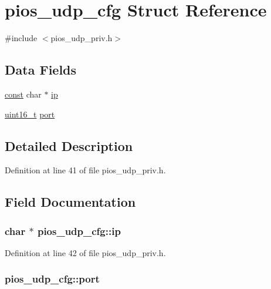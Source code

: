 \hypertarget{structpios__udp__cfg}{\section{pios\-\_\-udp\-\_\-cfg Struct Reference}
\label{structpios__udp__cfg}
}


{\ttfamily \#include $<$pios\-\_\-udp\-\_\-priv.\-h$>$}

\subsection*{Data Fields}
\begin{DoxyCompactItemize}
\item 
\hyperlink{group___n_a_m_e_ga7ae6d0e43244213b34de2c2b9aa30da6}{const} char $\ast$ \hyperlink{structpios__udp__cfg_ae175924ccc5810dfd561b30fb4e47287}{ip}
\item 
\hyperlink{stdint_8h_a273cf69d639a59973b6019625df33e30}{uint16\-\_\-t} \hyperlink{structpios__udp__cfg_a6bf021007efdfefaab8c7a27a6184636}{port}
\end{DoxyCompactItemize}


\subsection{Detailed Description}


Definition at line 41 of file pios\-\_\-udp\-\_\-priv.\-h.



\subsection{Field Documentation}
\hypertarget{structpios__udp__cfg_ae175924ccc5810dfd561b30fb4e47287}{
\subsubsection[{ip}]{ char $\ast$ pios\-\_\-udp\-\_\-cfg\-::ip}}\label{structpios__udp__cfg_ae175924ccc5810dfd561b30fb4e47287}


Definition at line 42 of file pios\-\_\-udp\-\_\-priv.\-h.

\hypertarget{structpios__udp__cfg_a6bf021007efdfefaab8c7a27a6184636}{
\subsubsection[{port}]{ pios\-\_\-udp\-\_\-cfg\-::port}}\label{structpios__udp__cfg_a6bf021007efdfefaab8c7a27a6184636}



